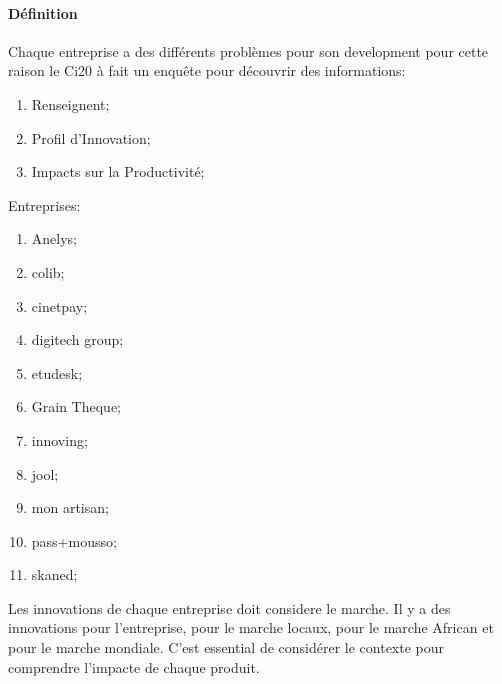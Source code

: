 \documentclass{article}
\begin{document}
\paragraph{Définition}Chaque entreprise a des différents problèmes pour son development pour cette raison le Ci20 à fait un enquête pour découvrir des informations:
\begin{enumerate}[noitemsep]
    \item Renseignent;
    \item Profil d'Innovation;
    \item Impacts sur la Productivité;
\end{enumerate}
\noindent Entreprises:
\begin{enumerate}[noitemsep]
    \item Anelys;
    \item colib;
    \item cinetpay;
    \item digitech group;
    \item etudesk;
    \item Grain Theque;
    \item innoving;
    \item jool;
    \item mon artisan;
    \item pass+mousso;
    \item skaned;
\end{enumerate}
\noindent Les innovations de chaque entreprise doit considere le marche. Il y a des innovations pour l'entreprise, pour le marche locaux, pour le marche African et pour le marche mondiale. C'est essential de considérer le contexte pour comprendre l'impacte de chaque produit.\\
\end{document}
